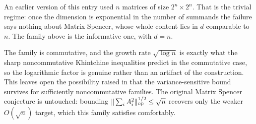 \begin{remark}
An earlier version of this entry used $n$ matrices of size $2^n\times2^n$.  That is the trivial regime: once the dimension is exponential in the number of summands the failure says nothing about Matrix Spencer, whose whole content lies in $d$ comparable to $n$.  The family above is the informative one, with $d=n$.

The family is commutative, and the growth rate $\sqrt{\log n}$ is exactly what the sharp noncommutative Khintchine inequalities predict in the commutative case, so the logarithmic factor is genuine rather than an artifact of the construction.  This leaves open the possibility raised in \citet{AkbasSra2026} that the variance-sensitive bound survives for sufficiently noncommutative families.  The original Matrix Spencer conjecture is untouched: bounding $\|\sum_iA_i^2\|_{\rm op}^{1/2}\le\sqrt n$ recovers only the weaker $O(\sqrt n)$ target, which this family satisfies comfortably.
\end{remark}

